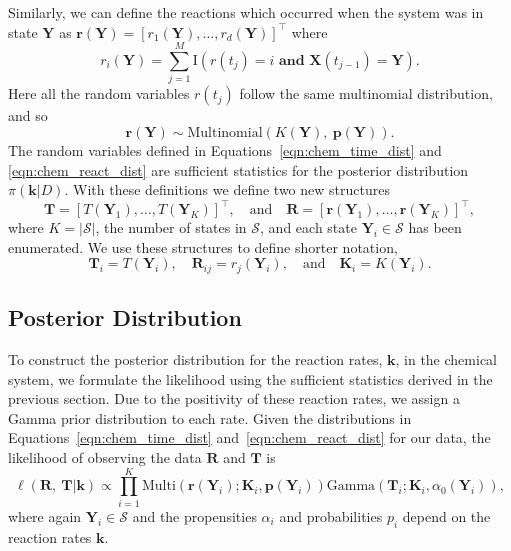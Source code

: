 \documentclass[final]{siamltex}
\begin{document}
Similarly, we can define the reactions which occurred when the system was in state $\mathbf{Y}$ as $\mathbf{r}(\mathbf{Y}) = [r_1(\mathbf{Y}), \ldots, r_d(\mathbf{Y})]^\top$ where
\[
	r_i(\mathbf{Y}) = \sum\limits_{j=1}^M \text{I}(r(t_j) = i \textbf{ and }\mathbf{X}(t_{j-1}) = \mathbf{Y}).
\]
Here all the random variables $r(t_j)$ follow the same multinomial distribution, and so
\begin{equation}\label{eqn:chem_react_dist}
	\mathbf{r}(\mathbf{Y}) \sim \text{Multinomial}(K(\mathbf{Y}),~\mathbf{p}(\mathbf{Y})). 
\end{equation}
The random variables defined in Equations~\eqref{eqn:chem_time_dist} and \eqref{eqn:chem_react_dist} are sufficient statistics for the posterior distribution $\pi(\mathbf{k}|D)$. With these definitions we define two new structures
\[
	\mathbf{T} = [T(\mathbf{Y}_1), \dots, T(\mathbf{Y}_K)]^\top, \quad \text{and} \quad \mathbf{R} = [\mathbf{r}(\mathbf{Y}_1), \dots, \mathbf{r}(\mathbf{Y}_K)]^\top,
\]
where $K = |\mathcal{S}|$, the number of states in $\mathcal{S}$, and each state $\mathbf{Y}_i \in \mathcal{S}$ has been enumerated. We use these structures to define shorter notation,
\[
	\mathbf{T}_i = T(\mathbf{Y}_i), \quad \mathbf{R}_{ij} = r_j(\mathbf{Y}_i), \quad \text{and} \quad \mathbf{K}_i = K(\mathbf{Y}_i).
\]

\subsection{Posterior Distribution}\label{sec:chem_stoch_posterior}

To construct the posterior distribution for the reaction rates, $\mathbf{k}$, in the chemical system, we formulate the likelihood using the sufficient statistics derived in the previous section. Due to the positivity of these reaction rates, we assign a Gamma prior distribution to each rate. Given the distributions in Equations~\eqref{eqn:chem_time_dist} and~\eqref{eqn:chem_react_dist} for our data, the likelihood of observing the data $\mathbf{R}$ and $\mathbf{T}$ is
\[
	\ell(\mathbf{R},~ \mathbf{T}|\mathbf{k}) \propto \prod\limits_{i=1}^K \text{Multi}(\mathbf{r}(\mathbf{Y}_i); \mathbf{K}_i, \mathbf{p}(\mathbf{Y}_i))\text{Gamma}(\mathbf{T}_i; \mathbf{K}_i, \alpha_0(\mathbf{Y}_i)),
\]
where again $\mathbf{Y}_i \in \mathcal{S}$ and the propensities $\alpha_i$ and probabilities $p_i$ depend on the reaction rates $\mathbf{k}$.
\end{document}
